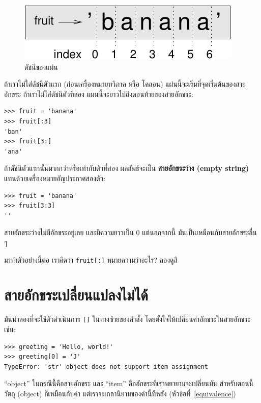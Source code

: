 \begin{figure}
\centerline
{\includegraphics[scale=0.8]{figs/banana.pdf}}
\caption{ดัชนีของแผ่น}
\label{fig.banana}
\end{figure}

ถ้าเราไม่ใส่ดัชนีตัวแรก (ก่อนเครื่องหมายทวิภาค หรือ โคลอน) แผ่นนี้จะเริ่มที่จุดเริ่มต้นของสายอักขระ
ถ้าเราไม่ใส่ดัชนีตัวที่สอง แผนนี้จะยาวไปถึงตอนท้ายของสายอักขระ:

\begin{verbatim}
>>> fruit = 'banana'
>>> fruit[:3]
'ban'
>>> fruit[3:]
'ana'
\end{verbatim}
%
ถ้าดัชนีตัวแรกนั้นมากกว่าหรือเท่ากับตัวที่สอง ผลลัพธ์จะเป็น {\bf สายอักขระว่าง (empty string)}
แทนด้วยเครื่องหมายอัญประกาศสองตัว:

\begin{verbatim}
>>> fruit = 'banana'
>>> fruit[3:3]
''
\end{verbatim}
%
สายอักขระว่างไม่มีอักขระอยู่เลย และมีความยาวเป็น 0 แต่นอกจากนี้ มันเป็นเหมือนกับสายอักขระอื่น ๆ

มาทำตัวอย่างนี้ต่อ เราคิดว่า {\tt fruit[:]} หมายความว่าอะไร?
ลองดูสิ



\section{สายอักขระเปลี่ยนแปลงไม่ได้} %

มันน่าลองที่จะใช้ตัวดำเนินการ {\tt []} ในทางซ้ายของคำสั่ง โดยตั้งใจให้เปลี่ยนค่าอักขระในสายอักขระ
เช่น:

\begin{verbatim}
>>> greeting = 'Hello, world!'
>>> greeting[0] = 'J'
TypeError: 'str' object does not support item assignment
\end{verbatim}
%
``object'' ในกรณีนี้คือสายอักขระ และ ``item'' คืออักขระที่เราพยายามจะเปลี่ยนมัน
สำหรับตอนนี้ วัตถุ (object) ก็เหมือนกับค่า แต่เราจะเกลานิยามของคำนี้ทีหลัง (หัวข้อที่~\ref{equivalence}) 

